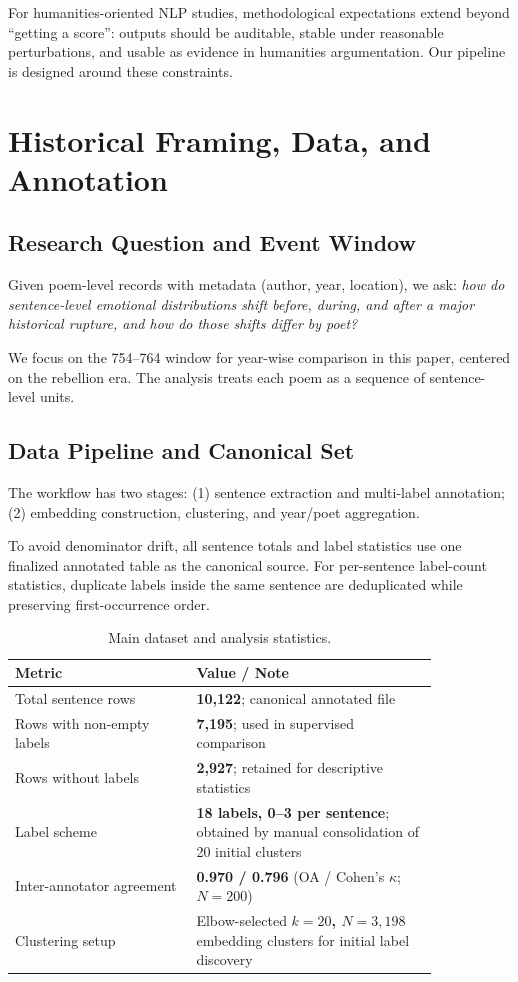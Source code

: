 \documentclass[11pt]{article}
\begin{document}
For humanities-oriented NLP studies, methodological expectations extend beyond ``getting a score'': outputs should be auditable, stable under reasonable perturbations, and usable as evidence in humanities argumentation.
Our pipeline is designed around these constraints.

\section{Historical Framing, Data, and Annotation}

\subsection{Research Question and Event Window}

Given poem-level records with metadata (author, year, location), we ask:
\textit{how do sentence-level emotional distributions shift before, during, and after a major historical rupture, and how do those shifts differ by poet?}

We focus on the 754--764 window for year-wise comparison in this paper, centered on the rebellion era.
The analysis treats each poem as a sequence of sentence-level units.

\subsection{Data Pipeline and Canonical Set}

The workflow has two stages:
(1) sentence extraction and multi-label annotation;
(2) embedding construction, clustering, and year/poet aggregation.

To avoid denominator drift, all sentence totals and label statistics use one finalized annotated table as the canonical source.
For per-sentence label-count statistics, duplicate labels inside the same sentence are deduplicated while preserving first-occurrence order.

\begin{table}[t]
\centering
\small
\begin{tabular}{p{0.36\linewidth}p{0.48\linewidth}}
\toprule
Metric & Value / Note \\
\midrule
Total sentence rows & \textbf{10,122}; canonical annotated file \\
Rows with non-empty labels & \textbf{7,195}; used in supervised comparison \\
Rows without labels & \textbf{2,927}; retained for descriptive statistics \\
Label scheme & \textbf{18 labels, 0--3 per sentence}; obtained by manual consolidation of 20 initial clusters \\
Inter-annotator agreement & \textbf{0.970 / 0.796} (OA / Cohen's \(\kappa\); \(N{=}200\)) \\
Clustering setup & Elbow-selected \textbf{\(k=20\), \(N=3,198\)} embedding clusters for initial label discovery \\
\bottomrule
\end{tabular}
\caption{Main dataset and analysis statistics.}
\label{tab:main_results}
\end{table}
\end{document}
